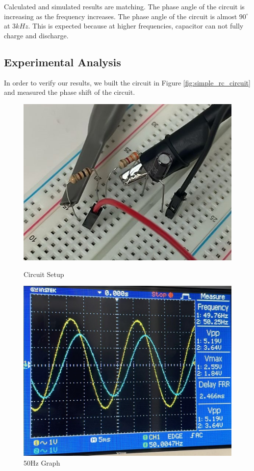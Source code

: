Calculated and simulated results are matching. The phase angle of the circuit is increasing as the frequency increases. The phase angle of the circuit is almost $90^{\circ}$ at $3kHz$. This is expected because at higher frequencies, capacitor can not fully charge and discharge.

\newpage
\thispagestyle{plain}

\subsection{Experimental Analysis}

In order to verify our results, we built the circuit in Figure \ref{fig:simple_rc_circuit} and measured the phase shift of the circuit.
\begin{figure}[h]
    \centering
    \begin{minipage}{.4\textwidth}
        \includegraphics[width=1\textwidth]{assets/exp2_circ.jpeg}
        \caption{Circuit Setup}
        \label{fig:exp2_circ}
    \end{minipage}%
    \begin{minipage}{.4\textwidth}
        \includegraphics[width=1\textwidth]{assets/exp2_50.jpeg}
        \caption{50Hz Graph}
        \label{fig:exp2_50}
    \end{minipage}
\end{figure}


